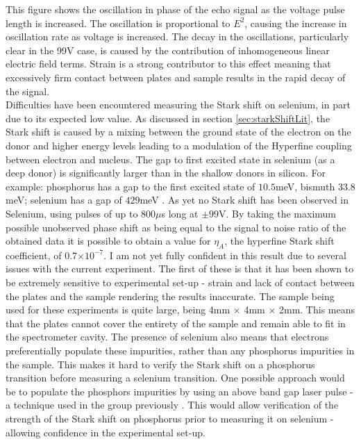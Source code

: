 This figure shows the oscillation in phase of the echo signal as the voltage pulse length is increased.
The oscillation is proportional to $E^2$, causing the increase in oscillation rate as voltage is increased.
The decay in the oscillations, particularly clear in the 99V case, is caused by the contribution of inhomogeneous linear electric field terms.
Strain is a strong contributor to this effect meaning that excessively firm contact between plates and sample results in the rapid decay of the signal.
\\
Difficulties have been encountered measuring the Stark shift on selenium, in part due to its expected low value.
As discussed in section \ref{sec:starkShiftLit}, the Stark shift is caused by a mixing between the ground state of the electron on the donor and higher energy levels leading to a modulation of the Hyperfine coupling between electron and nucleus.
The gap to first excited state in selenium (as a deep donor) is significantly larger than in the shallow donors in silicon. 
For example: phosphorus has a gap to the first excited state of $10.5$meV, bismuth $33.8$meV; selenium has a gap of $429$meV \cite{LoNardo2015,Nardo2015}. 
As yet no Stark shift has been observed in Selenium, using pulses of up to 800$\mu$s long at $\pm99$V.
By taking the maximum possible unobserved phase shift as being equal to the signal to noise ratio of the obtained data it is possible to obtain a value for $\eta_A$, the hyperfine Stark shift coefficient, of 0.7$\times10^{-7}$.
I am not yet fully confident in this result due to several issues with the current experiment.
The first of these is that it has been shown to be extremely sensitive to experimental set-up - strain and lack of contact between the plates and the sample rendering the results inaccurate.
The sample being used for these experiments is quite large, being 4mm $\times$ 4mm $\times$ 2mm.
This means that the plates cannot cover the entirety of the sample and remain able to fit in the spectrometer cavity.
The presence of selenium also means that electrons preferentially populate these impurities, rather than any phosphorus impurities in the sample.
This makes it hard to verify the Stark shift on a phosphorus transition before measuring a selenium transition.
One possible approach would be to populate the phosphors impurities by using an above band gap laser pulse - a technique used in the group previously \cite{Nardo2015}.
This would allow verification of the strength of the Stark shift on phosphorus prior to measuring it on selenium - allowing confidence in the experimental set-up.

